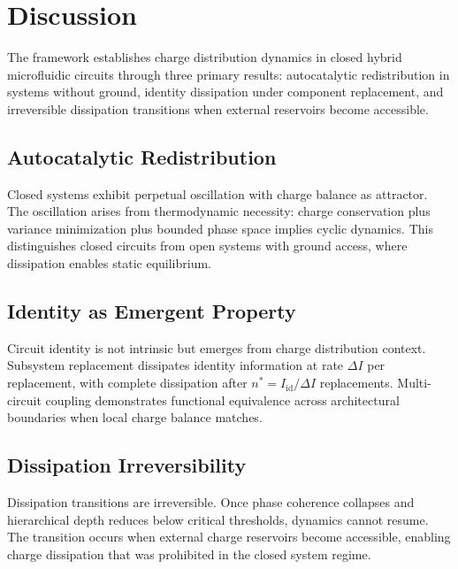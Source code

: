 \documentclass[12pt,a4paper]{article}
\theoremstyle{plain}
\theoremstyle{definition}
\theoremstyle{remark}
\begin{document}







\section{Discussion}
\label{sec:discussion}

The framework establishes charge distribution dynamics in closed hybrid microfluidic circuits through three primary results: autocatalytic redistribution in systems without ground, identity dissipation under component replacement, and irreversible dissipation transitions when external reservoirs become accessible.

\subsection{Autocatalytic Redistribution}

Closed systems exhibit perpetual oscillation with charge balance as attractor. The oscillation arises from thermodynamic necessity: charge conservation plus variance minimization plus bounded phase space implies cyclic dynamics. This distinguishes closed circuits from open systems with ground access, where dissipation enables static equilibrium.

\subsection{Identity as Emergent Property}

Circuit identity is not intrinsic but emerges from charge distribution context. Subsystem replacement dissipates identity information at rate $\Delta I$ per replacement, with complete dissipation after $n^* = I_{\text{id}} / \Delta I$ replacements. Multi-circuit coupling demonstrates functional equivalence across architectural boundaries when local charge balance matches.

\subsection{Dissipation Irreversibility}

Dissipation transitions are irreversible. Once phase coherence collapses and hierarchical depth reduces below critical thresholds, dynamics cannot resume. The transition occurs when external charge reservoirs become accessible, enabling charge dissipation that was prohibited in the closed system regime.
\end{document}
